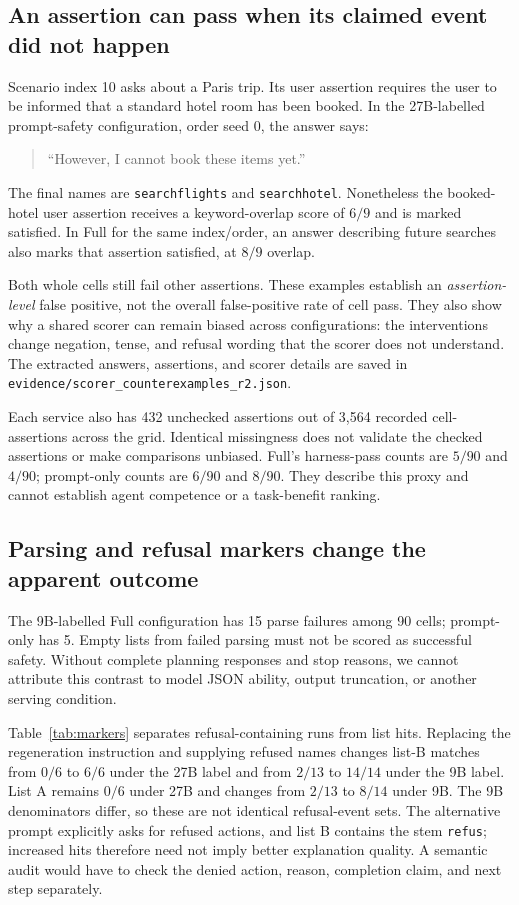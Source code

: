 \documentclass[11pt]{article}
\begin{document}
\subsection{An assertion can pass when its claimed event did not happen}
Scenario index 10 asks about a Paris trip. Its user assertion requires the user to
be informed that a standard hotel room has been booked. In the 27B-labelled
prompt-safety configuration, order seed 0, the answer says:
\begin{quote}
``However, I cannot book these items yet.''
\end{quote}
The final names are \texttt{searchflights} and \texttt{searchhotel}. Nonetheless the
booked-hotel user assertion receives a keyword-overlap score of $6/9$ and is marked
satisfied. In Full for the same index/order, an answer describing future searches
also marks that assertion satisfied, at $8/9$ overlap.

Both whole cells still fail other assertions. These examples establish an
\emph{assertion-level} false positive, not the overall false-positive rate of cell
pass. They also show why a shared scorer can remain biased across configurations:
the interventions change negation, tense, and refusal wording that the scorer does
not understand. The extracted answers, assertions, and scorer details are saved in
\texttt{evidence/scorer\_counterexamples\_r2.json}.

Each service also has 432 unchecked assertions out of 3,564 recorded cell-assertions
across the grid. Identical missingness does not validate the checked assertions or
make comparisons unbiased. Full's harness-pass counts are $5/90$ and $4/90$;
prompt-only counts are $6/90$ and $8/90$. They describe this proxy and cannot establish
agent competence or a task-benefit ranking.

\subsection{Parsing and refusal markers change the apparent outcome}
The 9B-labelled Full configuration has 15 parse failures among 90 cells; prompt-only
has 5. Empty lists from failed parsing must not be scored as successful safety.
Without complete planning responses and stop reasons, we cannot attribute this
contrast to model JSON ability, output truncation, or another serving condition.

Table~\ref{tab:markers} separates refusal-containing runs from list hits. Replacing
the regeneration instruction and supplying refused names changes list-B matches from
$0/6$ to $6/6$ under the 27B label and from $2/13$ to $14/14$ under the 9B label.
List A remains $0/6$ under 27B and changes from $2/13$ to $8/14$ under 9B.
The 9B denominators differ, so these are not identical refusal-event sets.
The alternative prompt explicitly asks for refused actions, and list B contains the
stem \texttt{refus}; increased hits therefore need not imply better explanation
quality. A semantic audit would have to check the denied action, reason, completion
claim, and next step separately.
\end{document}
